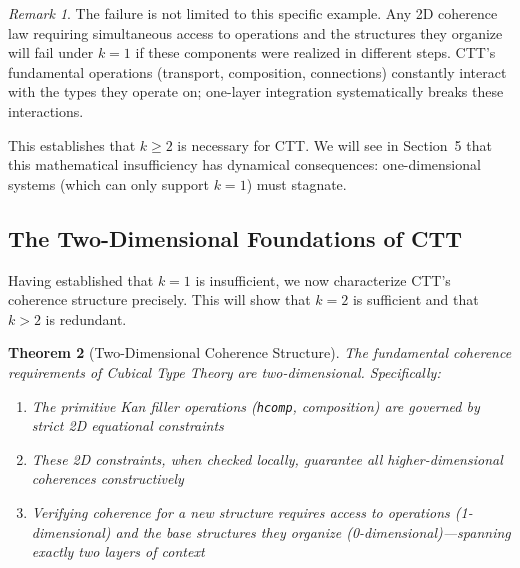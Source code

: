\documentclass[11pt]{article}
\newtheorem{theorem}{Theorem}[section]
\theoremstyle{definition}
\theoremstyle{remark}
\newtheorem{remark}[theorem]{Remark}
\begin{document}
\begin{remark}
The failure is not limited to this specific example. Any 2D coherence law requiring simultaneous
access to operations and the structures they organize will fail under $k = 1$ if these components
were realized in different steps. CTT's fundamental operations (transport, composition, connections)
constantly interact with the types they operate on; one-layer integration systematically breaks these
interactions.
\end{remark}

This establishes that $k \geq 2$ is necessary for CTT. We will see in Section~5 that this mathematical
insufficiency has dynamical consequences: one-dimensional systems (which can only support $k = 1$)
must stagnate.

\subsection{The Two-Dimensional Foundations of CTT}

Having established that $k = 1$ is insufficient, we now characterize CTT's coherence structure precisely.
This will show that $k = 2$ is sufficient and that $k > 2$ is redundant.

\begin{theorem}[Two-Dimensional Coherence Structure]
\label{thm:2d-coherence}
The fundamental coherence requirements of Cubical Type Theory are two-dimensional. Specifically:
\begin{enumerate}
\item The primitive Kan filler operations (\texttt{hcomp}, composition) are governed by strict 2D
equational constraints
\item These 2D constraints, when checked locally, guarantee all higher-dimensional coherences constructively
\item Verifying coherence for a new structure requires access to operations (1-dimensional) and the
base structures they organize (0-dimensional)---spanning exactly two layers of context
\end{enumerate}
\end{theorem}
\end{document}
